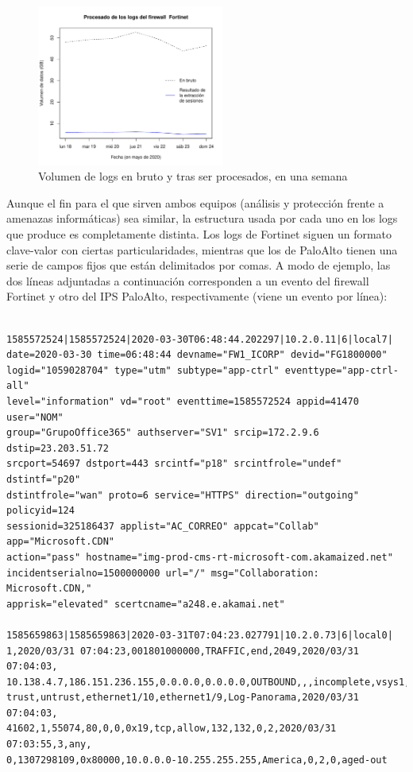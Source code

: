 \begin{figure}[h]
    \centering
    \includegraphics[width=0.55\textwidth]{../figures/volumen_logs.pdf}
    \caption{Volumen de logs en bruto y tras ser procesados, en una semana}
    \label{fig:volumenlogs}
\end{figure}

Aunque el fin para el que sirven ambos equipos (análisis y protección frente a amenazas informáticas) sea similar,
la estructura usada por cada uno en los logs que produce es completamente distinta.
Los logs de Fortinet siguen un formato clave-valor con ciertas particularidades, mientras que los de PaloAlto tienen una serie de campos fijos que están delimitados por comas.
A modo de ejemplo, las dos líneas adjuntadas a continuación corresponden a un evento del firewall Fortinet y otro del IPS PaloAlto, respectivamente (viene un evento por línea):

\begingroup
\makeatletter
\@totalleftmargin=-1cm
\begin{verbatim}

1585572524|1585572524|2020-03-30T06:48:44.202297|10.2.0.11|6|local7|
date=2020-03-30 time=06:48:44 devname="FW1_ICORP" devid="FG1800000"
logid="1059028704" type="utm" subtype="app-ctrl" eventtype="app-ctrl-all"
level="information" vd="root" eventtime=1585572524 appid=41470 user="NOM"
group="GrupoOffice365" authserver="SV1" srcip=172.2.9.6 dstip=23.203.51.72
srcport=54697 dstport=443 srcintf="p18" srcintfrole="undef" dstintf="p20"
dstintfrole="wan" proto=6 service="HTTPS" direction="outgoing" policyid=124
sessionid=325186437 applist="AC_CORREO" appcat="Collab" app="Microsoft.CDN"
action="pass" hostname="img-prod-cms-rt-microsoft-com.akamaized.net"
incidentserialno=1500000000 url="/" msg="Collaboration: Microsoft.CDN,"
apprisk="elevated" scertcname="a248.e.akamai.net"

1585659863|1585659863|2020-03-31T07:04:23.027791|10.2.0.73|6|local0|
1,2020/03/31 07:04:23,001801000000,TRAFFIC,end,2049,2020/03/31 07:04:03,
10.138.4.7,186.151.236.155,0.0.0.0,0.0.0.0,OUTBOUND,,,incomplete,vsys1,
trust,untrust,ethernet1/10,ethernet1/9,Log-Panorama,2020/03/31 07:04:03,
41602,1,55074,80,0,0,0x19,tcp,allow,132,132,0,2,2020/03/31 07:03:55,3,any,
0,1307298109,0x80000,10.0.0.0-10.255.255.255,America,0,2,0,aged-out

\end{verbatim}
\endgroup

